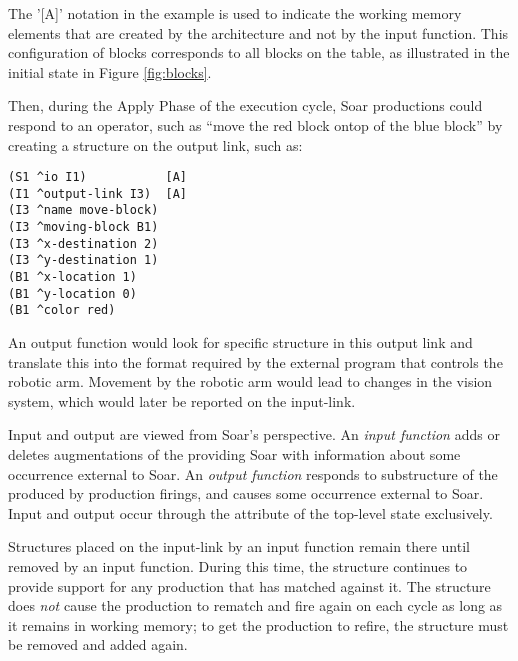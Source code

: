 The '[A]' notation in the example is used to indicate the working memory
elements that are created by the architecture and not by the input function.
This configuration of blocks corresponds to all blocks on the table, as
illustrated in the initial state in Figure \ref{fig:blocks}.

\begin{figure}
\label{fig:blocks-outputlink}
\end{figure}

Then, during the Apply Phase of the execution cycle, Soar productions could 
respond to an operator, such as ``move the red block
ontop of the blue block'' by creating a structure on the output link, such as:

\begin{verbatim}
(S1 ^io I1)           [A]
(I1 ^output-link I3)  [A]
(I3 ^name move-block)
(I3 ^moving-block B1)
(I3 ^x-destination 2)
(I3 ^y-destination 1)
(B1 ^x-location 1)
(B1 ^y-location 0)
(B1 ^color red)
\end{verbatim}  \vspace{12pt}

An output function would look for specific structure in this output link and
translate this into the format required by the external program that controls
the robotic arm. Movement by the robotic arm would lead to changes in the 
vision system, which would later be reported on the input-link.

Input and output are viewed from Soar's perspective. An \emph{input
function} adds or deletes augmentations of the  
providing Soar with information about some occurrence external to Soar. An
\emph{output function} responds to substructure of the 
produced by production firings, and causes some occurrence external to
Soar. Input and output occur through the  attribute of the top-level
state exclusively.

Structures placed on the input-link by an input function remain there until removed
by an input function. During this time, the structure continues to provide support for
any production that has matched against it. The structure does \emph{not} cause the production
to rematch and fire again on each cycle as long as it remains in working memory;
to get the production to refire, the structure must be removed and added again.



